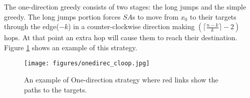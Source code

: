  
% 
The one-direction greedy consists of two stages: the long jumps and the simple greedy. The long jumps portion forces $SA$s to move from $x_{0}$ to their targets through the edge($-k$) in a counter-clockwise direction making  $(\lceil  \frac {n-k}{k} \rceil -2)$ hops. At that point an extra hop will cause them to reach their destination. Figure \ref{fig:onedirec_cloop} shows an example of this strategy.
\begin{figure}[H]
  \centering  
  \texttt{[image: figures/onedirec\_cloop.jpg]}
  \caption{\small {An example of One-direction strategy where red links show the paths to the targets.}}\label{fig:onedirec_cloop}
\end{figure}
